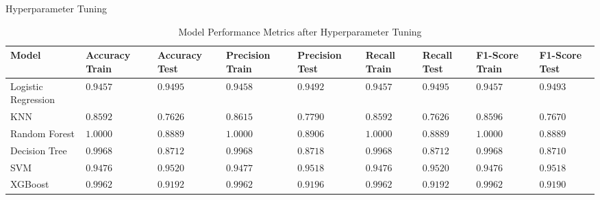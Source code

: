 \documentclass[14pt, aspectratio=169]{beamer}
\begin{document}
\begin{frame}{Hyperparameter Tuning}
\begin{table}[H]
  \centering
  \begin{tabular}{p{1.5cm}p{1cm}p{1cm}p{1cm}p{1cm}p{1cm}p{1cm}p{0.75cm}p{0.75cm}}
  \toprule
  \textbf{Model} & \textbf{Accuracy Train} & \textbf{Accuracy Test} & \textbf{Precision Train} & \textbf{Precision Test} & \textbf{Recall Train} & \textbf{Recall Test} & \textbf{F1-Score Train} & \textbf{F1-Score Test} \\
  \toprule
  Logistic Regression & $0.9457$ & $0.9495$ & $0.9458$ & $0.9492$ & $0.9457$ & $0.9495$ & $0.9457$ & $0.9493$ \\
  \midrule
  KNN & $0.8592$ & $0.7626$ & $0.8615$ & $0.7790$ & $0.8592$ & $0.7626$ & $0.8596$ & $0.7670$ \\
  \midrule
  Random Forest & $1.0000$ & $0.8889$ & $1.0000$ & $0.8906$ & $1.0000$ & $0.8889$ & $1.0000$ & $0.8889$ \\
  \midrule
  Decision Tree & $0.9968$ & $0.8712$ & $0.9968$ & $0.8718$ & $0.9968$ & $0.8712$ & $0.9968$ & $0.8710$ \\
  \midrule
  SVM & $0.9476$ & $0.9520$ & $0.9477$ & $0.9518$ & $0.9476$ & $0.9520$ & $0.9476$ & $0.9518$ \\
  \midrule
  XGBoost & $0.9962$ & $0.9192$ & $0.9962$ & $0.9196$ & $0.9962$ & $0.9192$ & $0.9962$ & $0.9190$ \\
  \toprule
  \end{tabular}
  \caption{Model Performance Metrics after Hyperparameter Tuning}
  \label{tab:tuned_per_mat}
\end{table}

\end{frame}
\end{document}
